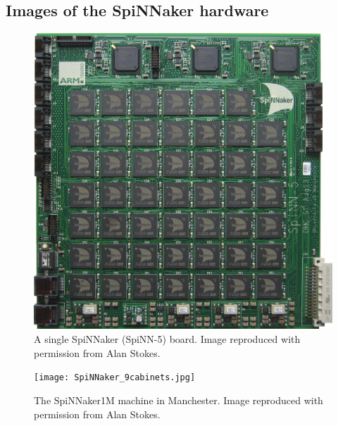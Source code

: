 \documentclass[]{article}
\begin{document}
\begin{appendices}
\section{Images of the SpiNNaker hardware}
\label{sec:spinn_photos}

\begin{figure}[H]
  \includegraphics[width=\linewidth]{spinnakerBoard.jpg}
  \caption{A single SpiNNaker (SpiNN-5) board.
  Image reproduced with permission from Alan Stokes.}
\end{figure}

\begin{figure}[H]
  \texttt{[image: SpiNNaker\_9cabinets.jpg]}
  \caption{The SpiNNaker1M machine in Manchester.
  Image reproduced with permission from Alan Stokes.}
\end{figure}

\end{appendices}
\end{document}
